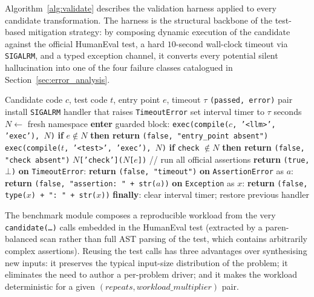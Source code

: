 \documentclass[conference]{IEEEtran}
\begin{document}
Algorithm~\ref{alg:validate} describes the validation harness applied to every candidate transformation. The harness is the structural backbone of the test-based mitigation strategy: by composing dynamic execution of the candidate against the official HumanEval test, a hard $10$-second wall-clock timeout via \texttt{SIGALRM}, and a typed exception channel, it converts every potential silent hallucination into one of the four failure classes catalogued in Section~\ref{sec:error_analysis}.

\begin{algorithm}[htbp]
\caption{Test-based validation harness}
\label{alg:validate}
\begin{algorithmic}[1]
\REQUIRE Candidate code $c$, test code $t$, entry point $e$, timeout $\tau$
\ENSURE \texttt{(passed, error)} pair
\STATE install \texttt{SIGALRM} handler that raises \texttt{TimeoutError}
\STATE set interval timer to $\tau$ seconds
\STATE $N \leftarrow$ fresh namespace
\STATE \textbf{enter} guarded block:
\STATE \quad \texttt{exec(compile($c$, '<llm>', 'exec'), $N$)}
\STATE \quad \textbf{if} $e \notin N$ \textbf{then return} \texttt{(false, "entry\_point absent")}
\STATE \quad \texttt{exec(compile($t$, '<test>', 'exec'), $N$)}
\STATE \quad \textbf{if} \texttt{check} $\notin N$ \textbf{then return} \texttt{(false, "check absent")}
\STATE \quad \texttt{$N$['check']($N$[$e$])} \quad // run all official assertions
\STATE \quad \textbf{return} \texttt{(true, $\bot$)}
\STATE \textbf{on} \texttt{TimeoutError}: \textbf{return} \texttt{(false, "timeout")}
\STATE \textbf{on} \texttt{AssertionError} as $a$: \textbf{return} \texttt{(false, "assertion: " + str($a$))}
\STATE \textbf{on} \texttt{Exception} as $x$: \textbf{return} \texttt{(false, type($x$) + ": " + str($x$))}
\STATE \textbf{finally}: clear interval timer; restore previous handler
\end{algorithmic}
\end{algorithm}

The benchmark module composes a reproducible workload from the very \texttt{candidate(\ldots)} calls embedded in the HumanEval test (extracted by a paren-balanced scan rather than full AST parsing of the test, which contains arbitrarily complex assertions). Reusing the test calls has three advantages over synthesising new inputs: it preserves the typical input-size distribution of the problem; it eliminates the need to author a per-problem driver; and it makes the workload deterministic for a given $(\mathit{repeats}, \mathit{workload\_multiplier})$ pair.
\end{document}
